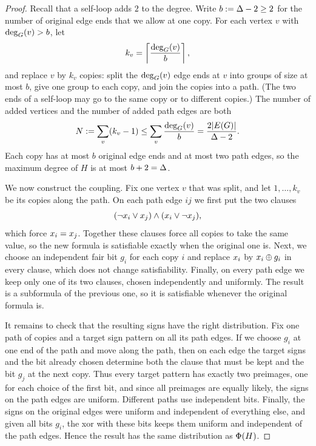 \begin{proof}
Recall that a self-loop adds \(2\) to the degree. Write \(b:=\Delta-2\ge2\) for
the number of original edge ends that we allow at one copy. For each vertex
\(v\) with \(\deg_{G}(v)>b\), let
\[
  k_v=\left\lceil\frac{\deg_{G}(v)}{b}\right\rceil,
\]
and replace \(v\) by \(k_v\) copies: split the \(\deg_{G}(v)\) edge ends at
\(v\) into groups of size at most \(b\), give one group to each copy, and join
the copies into a path. (The two ends of a self-loop may go to the same copy or
to different copies.) The number of added vertices and the number of added path
edges are both
\[
  N:=\sum_v(k_v-1)
  \le\sum_v\frac{\deg_{G}(v)}{b}
  =\frac{2|E(G)|}{\Delta-2}.
\]
Each copy has at most \(b\) original edge ends and at most two path edges, so
the maximum degree of \(H\) is at most \(b+2=\Delta\).

We now construct the coupling. Fix one vertex \(v\) that was split, and let
\(1,\ldots,k_v\) be its copies along the path. On each path edge \(ij\) we
first put the two clauses
\[
  (\neg x_{i}\vee x_{j})\wedge(x_{i}\vee\neg x_{j}),
\]
which force \(x_{i}=x_{j}\). Together these clauses force all copies to
take the same value, so the new formula is satisfiable exactly when the
original one is. Next, we choose an independent fair bit \(g_i\) for each copy
\(i\) and replace \(x_{i}\) by \(x_{i}\oplus g_i\) in every clause, which
does not change satisfiability. Finally, on every path edge we keep only one of
its two clauses, chosen independently and uniformly. The result is a
subformula of the previous one, so it is satisfiable whenever the original
formula is.

It remains to check that the resulting signs have the right distribution. Fix
one path of copies and a target sign pattern on all its path edges. If we
choose \(g_i\) at one end of the path and move along the path, then on each
edge the target signs and the bit already chosen determine both the clause that
must be kept and the bit \(g_j\) at the next copy. Thus every target pattern has
exactly two preimages, one for each choice of the first bit, and since all
preimages are equally likely, the signs on the path edges are uniform.
Different paths use independent bits. Finally, the signs on the original edges
were uniform and independent of everything else, and given all bits \(g_i\),
the xor with these bits keeps them uniform and independent of the path edges.
Hence the result has the same distribution as \(\Phi(H)\).
\end{proof}


